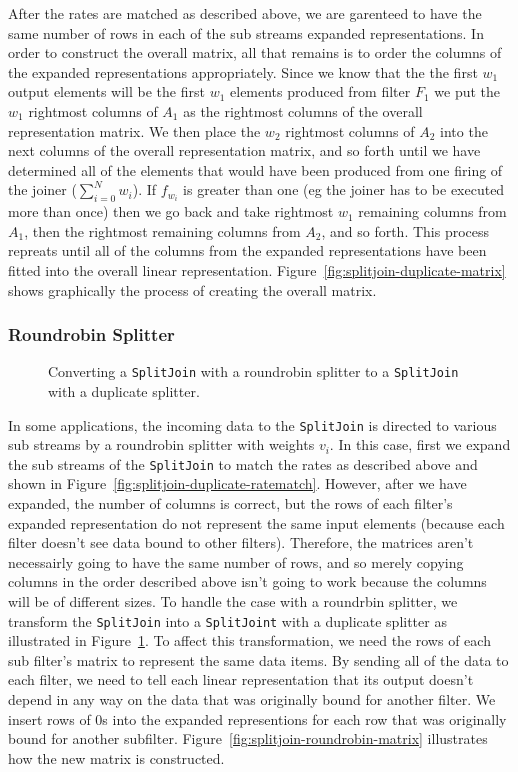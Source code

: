 After the rates are matched as described above, we are garenteed to have the same number of rows
in each of the sub streams expanded representations. In order to construct the overall matrix, 
all that remains is to order the columns of the expanded representations appropriately. 
Since we know that the the first $w_1$ output elements will be the first $w_1$ elements 
produced from filter $F_1$ we put the $w_1$ rightmost columns of $A_1$ as the rightmost
columns of the overall representation matrix. We then place the $w_2$ rightmost columns of $A_2$ 
into the next columns of the overall representation matrix, and so forth until
we have determined all of the elements that would have been produced from one firing of 
the joiner ($\sum_{i=0}^{N} w_{i}$). If $f_{w_i}$ is greater than one 
(eg the joiner has to be executed more than once) then we go back and take rightmost
$w_1$ remaining columns from $A_1$, then the rightmost remaining columns from $A_2$, and
so forth. This process repreats until all of the columns from the expanded representations have
been fitted into the overall linear representation. Figure~\ref{fig:splitjoin-duplicate-matrix} 
shows graphically the process of creating the overall matrix.


\subsubsection{Roundrobin Splitter}

\begin{figure}
\center
\epsfxsize=3.0in
\caption{Converting a {\tt SplitJoin} with a roundrobin splitter to a {\tt SplitJoin} with a duplicate splitter.}
\label{fig:splitjoin-roundrobin-to-duplicate}
\end{figure}

In some applications, the incoming data to the {\tt SplitJoin} is directed to various sub streams 
by a roundrobin splitter with weights $v_i$. In this case, first we expand the sub streams of the
{\tt SplitJoin} to match the rates as described above and shown in 
Figure~\ref{fig:splitjoin-duplicate-ratematch}. However, after we have expanded, the number of
columns is correct, but the rows of each filter's expanded representation do not represent the
same input elements (because each filter doesn't see data bound to other filters). Therefore,
the matrices aren't necessairly going to have the same number of rows, and so merely
copying columns in the order described above isn't going to work because the columns will be 
of different sizes. To handle the case with a roundrbin splitter, we transform the {\tt SplitJoin} 
into a {\tt SplitJoint} with a duplicate splitter as illustrated in 
Figure~\ref{fig:splitjoin-roundrobin-to-duplicate}. To affect this transformation, we need the rows
of each sub filter's matrix to represent the same data items. By sending all of the data to each filter,
we need to tell each linear representation that its output doesn't depend in any way on the data that 
was originally bound for another filter. We insert rows of $0$s into the expanded representions
for each row that was originally bound for another subfilter. Figure~\ref{fig:splitjoin-roundrobin-matrix}
illustrates how the new matrix is constructed.

